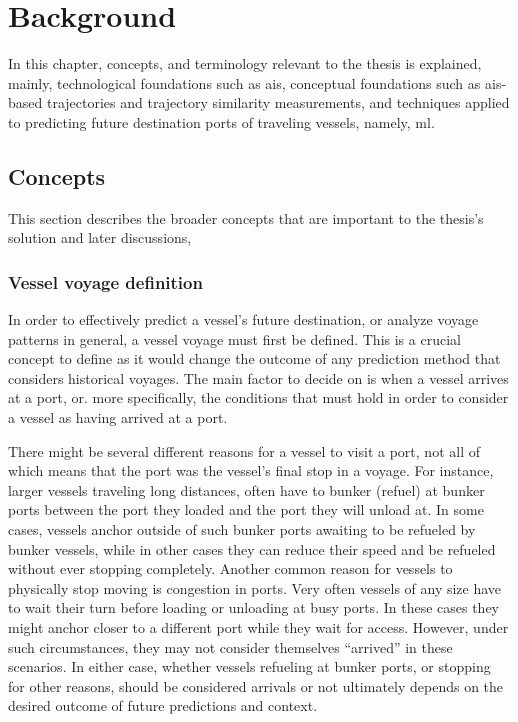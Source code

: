 \chapter{Background}

In this chapter, concepts, and terminology relevant to the thesis is explained, mainly, technological foundations such as \acrfull{ais}, conceptual foundations such as \acrshort{ais}-based trajectories and trajectory similarity measurements, and techniques applied to predicting future destination ports of traveling vessels, namely, \acrfull{ml}.

\section{Concepts}

This section describes the broader concepts that are important to the thesis's solution and later discussions,

\subsection{Vessel voyage definition}
\label{sec:vessel_voyage_definition}

In order to effectively predict a vessel's future destination, or analyze voyage patterns in general, a vessel voyage must first be defined. This is a crucial concept to define as it would change the outcome of any prediction method that considers historical voyages. The main factor to decide on is when a vessel arrives at a port, or. more specifically, the conditions that must hold in order to consider a  vessel as having arrived at a port.

There might be several different reasons for a vessel to visit a port, not all of which means that the port was the vessel's final stop in a voyage. For instance, larger vessels traveling long distances, often have to bunker (refuel) at bunker ports between the port they loaded and the port they will unload at. In some cases, vessels anchor outside of such bunker ports awaiting to be refueled by bunker vessels, while in other cases they can reduce their speed and be refueled without ever stopping completely. Another common reason for vessels to physically stop moving is congestion in ports. Very often vessels of any size have to wait their turn before loading or unloading at busy ports. In these cases they might anchor closer to a different port while they wait for access. However, under such circumstances, they may not consider themselves ``arrived'' in these scenarios. In either case, whether vessels refueling at bunker ports, or stopping for other reasons, should be considered arrivals or not ultimately depends on the desired outcome of future predictions and context.


